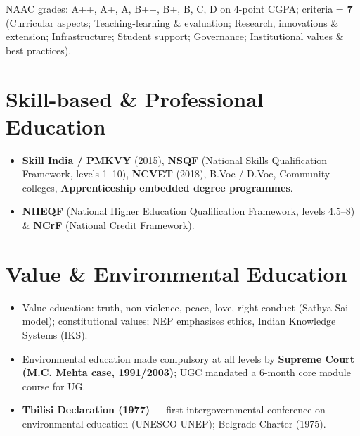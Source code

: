 \endgroup

NAAC grades: A++, A+, A, B++, B+, B, C, D on 4-point CGPA; criteria = \textbf{7} (Curricular aspects; Teaching-learning \& evaluation; Research, innovations \& extension; Infrastructure; Student support; Governance; Institutional values \& best practices).

\needspace{95pt}

\hypertarget{p1-10--6-skill-based--professional-education}{%
\section{Skill-based \& Professional Education}\label{p1-10--6-skill-based--professional-education}}

\begin{itemize}
\tightlist
\item
  \textbf{Skill India / PMKVY} (2015), \textbf{NSQF} (National Skills Qualification Framework, levels 1--10), \textbf{NCVET} (2018), B.Voc / D.Voc, Community colleges, \textbf{Apprenticeship embedded degree programmes}.
\item
  \textbf{NHEQF} (National Higher Education Qualification Framework, levels 4.5--8) \& \textbf{NCrF} (National Credit Framework).
\end{itemize}

\needspace{95pt}

\hypertarget{p1-10--7-value--environmental-education}{%
\section{Value \& Environmental Education}\label{p1-10--7-value--environmental-education}}

\begin{itemize}
\tightlist
\item
  Value education: truth, non-violence, peace, love, right conduct (Sathya Sai model); constitutional values; NEP emphasises ethics, Indian Knowledge Systems (IKS).
\item
  Environmental education made compulsory at all levels by \textbf{Supreme Court (M.C. Mehta case, 1991/2003)}; UGC mandated a 6-month core module course for UG.
\item
  \textbf{Tbilisi Declaration (1977)} --- first intergovernmental conference on environmental education (UNESCO-UNEP); Belgrade Charter (1975).
\end{itemize}

\needspace{125pt}


